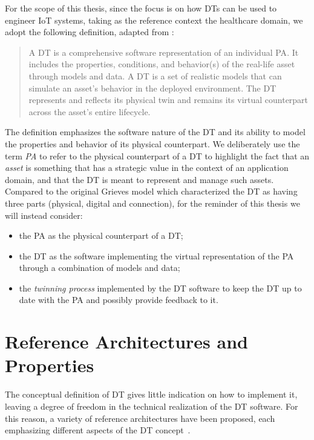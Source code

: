 For the scope of this thesis, 
since the focus is on how \acp{DT} can be used to engineer \ac{IoT} systems, taking as the reference context the healthcare domain,
we adopt the following definition, adapted from \cite{dt-IoT-context-Minerva-2020}:

\begin{quote}
A \acf{DT} is a comprehensive software representation of an individual \acl{PA}.
It includes the properties, conditions, and behavior(s) of the real-life asset through models and data.
A \ac{DT} is a set of realistic models that can simulate an asset's behavior in the deployed environment.
The \ac{DT} represents and reflects its physical twin and remains its virtual counterpart across the asset's entire lifecycle.
\end{quote}

The definition emphasizes the software nature of the \ac{DT} and its ability to model the properties and behavior of its physical counterpart.
%
We deliberately use the term \emph{\ac{PA}} to refer to the physical counterpart of a \ac{DT}
to highlight the fact that an \emph{asset} is something that has a strategic
value in the context of an application domain, and that the \ac{DT} is meant to represent and manage such assets.
%
Compared to the original Grieves model which characterized the \ac{DT} as having three parts (physical, digital and connection), for the reminder of this thesis we will instead consider:
\begin{itemize}
\item the \ac{PA} as the physical counterpart of a \ac{DT};
\item the \ac{DT} as the software implementing the virtual representation of the \ac{PA} through a combination of models and data;
\item the \emph{twinning process} implemented by the \ac{DT} software to keep the \ac{DT} up to date with the \ac{PA} and possibly provide feedback to it.
\end{itemize}

\section{Reference Architectures and Properties}

The conceptual definition of \ac{DT} gives little indication on how to implement it,
leaving a degree of freedom in the technical realization of the \ac{DT} software.
%
For this reason, a variety of reference architectures have been proposed, 
each emphasizing different aspects of the \ac{DT} concept~\cite{ferko2022architecting}.

